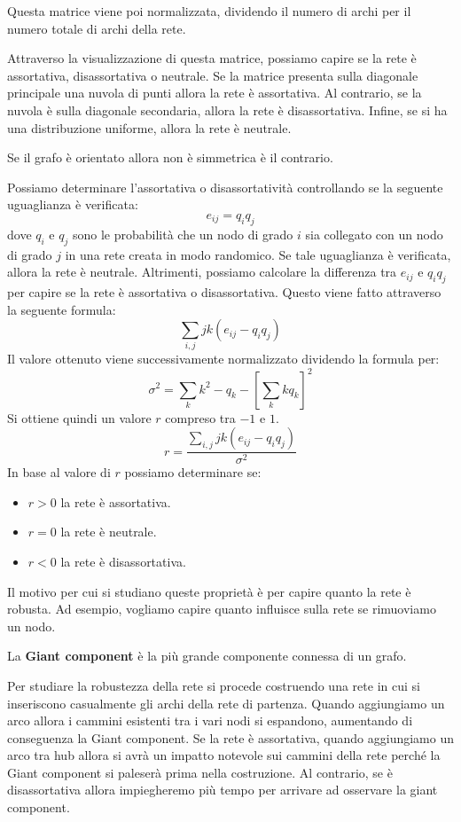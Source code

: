 Questa matrice viene poi normalizzata, dividendo il numero di archi per il numero
totale di archi della rete.

Attraverso la visualizzazione di questa matrice, possiamo capire se la rete è
assortativa, disassortativa o neutrale. Se la matrice presenta sulla diagonale
principale una nuvola di punti allora la rete è assortativa. Al contrario, se
la nuvola è sulla diagonale secondaria, allora la rete è disassortativa. Infine,
se si ha una distribuzione uniforme, allora la rete è neutrale.
\begin{nota}
    Se il grafo è orientato allora non è simmetrica è il contrario.
\end{nota}

Possiamo determinare l'assortativa o disassortatività controllando se la seguente
uguaglianza è verificata:
\begin{equation}
    e_{ij} = q_iq_j
\end{equation}
dove $q_i$ e $q_j$ sono le probabilità che un nodo di grado $i$ sia collegato
con un nodo di grado $j$ in una rete creata in modo randomico. Se tale uguaglianza
è verificata, allora la rete è neutrale. Altrimenti, possiamo calcolare la
differenza tra $e_{ij}$ e $q_iq_j$ per capire se la rete è assortativa o
disassortativa. Questo viene fatto attraverso la seguente formula:
\begin{equation}
    \sum_{i, j}jk(e_{ij} - q_iq_j)
\end{equation}
Il valore ottenuto viene successivamente normalizzato dividendo la formula per:
\begin{equation}
    \sigma^2 = \sum_{k}k^2  - q_k - \left[\sum_{k}kq_k\right]^2
\end{equation}
Si ottiene quindi un valore $r$ compreso tra $-1$ e $1$.
\begin{equation}
    r = \frac{\sum_{i, j}jk(e_{ij} - q_iq_j)}{\sigma^2}
\end{equation}
In base al valore di $r$ possiamo determinare se:
\begin{itemize}
    \item $r > 0$ la rete è assortativa.
    \item $r = 0$ la rete è neutrale.
    \item $r < 0$ la rete è disassortativa.
\end{itemize}
Il motivo per cui si studiano queste proprietà è per capire quanto la rete è
robusta. Ad esempio, vogliamo capire quanto influisce sulla rete se rimuoviamo
un nodo.
\begin{definizione}
    La \textbf{Giant component} è la più grande componente connessa di un grafo.
\end{definizione}
Per studiare la robustezza della rete si procede costruendo una rete in cui si
inseriscono casualmente gli archi della rete di partenza. Quando aggiungiamo un
arco allora i cammini esistenti tra i vari nodi si espandono, aumentando di
conseguenza la Giant component. Se la rete è assortativa, quando aggiungiamo un
arco tra hub allora si avrà un impatto notevole sui cammini della rete perché la
Giant component si paleserà prima nella costruzione. Al contrario, se è
disassortativa allora impiegheremo più tempo per arrivare ad osservare la giant
component.

